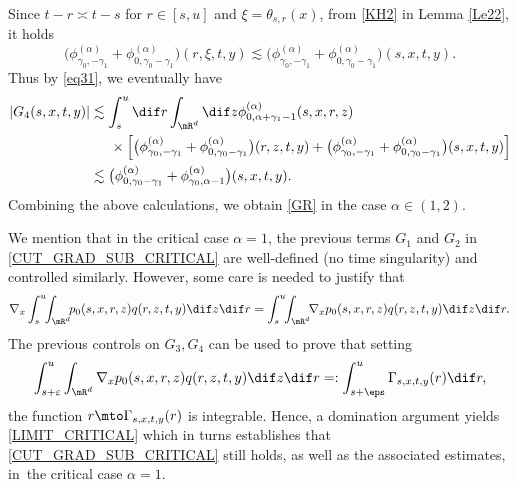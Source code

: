 Since $t-r \asymp t-s$ for $r\in[s,u]$ and $\xi=\theta_{s,r}(x)$, from \eqref{KH2} in Lemma \ref{Le22}, it holds
\[
\bigl(\phi^{(\alpha)}_{\gamma_0,-\gamma_1}+\phi^{(\alpha)}_{0,\gamma_0-\gamma_1}\bigr)(r,\xi,t,y)\lesssim \bigl(\phi^{(\alpha)}_{\gamma_0,-\gamma_1}+\phi^{(\alpha)}_{0,\gamma_0-\gamma_1}\bigr)(s,x,t,y).
\]
Thus by \eqref{eq31}, we eventually have
\begin{align*}
|G_4(s,x,t,y)|
&\lesssim \int_s^u\dif r \int_{\mR^d} \dif z \phi_{0,\alpha+\gamma_1-1}^{(\alpha)}(s,x,r,z)\\
&\hspace*{.5cm}\times\Big[ \bigl(\phi^{(\alpha)}_{\gamma_0,-\gamma_1}+\phi^{(\alpha)}_{0,\gamma_0-\gamma_1}\bigr)(r,z,t,y)+ \bigl(\phi^{(\alpha)}_{\gamma_0,-\gamma_1}+\phi^{(\alpha)}_{0,\gamma_0-\gamma_1}\bigr)(s,x,t,y) \Big]\\
&\lesssim \bigl(\phi^{(\alpha)}_{0,\gamma_0-\gamma_1}+\phi^{(\alpha)}_{\gamma_0,\alpha-1}\bigr)(s,x,t,y).
\end{align*}
Combining the above calculations, we obtain \eqref{GR} in the case $\alpha\in (1,2) $.

{We mention that in the critical case $\alpha=1 $, the previous terms $G_1$ and $G_2$ in \eqref{CUT_GRAD_SUB_CRITICAL} are well-defined (no time singularity) and controlled similarly. However, some care is needed to justify that
\begin{equation}\label{LIMIT_CRITICAL}
\nabla_x \int_s^u\!\!\int_{\mR^d}\!\! {p}_0(s,x,r,z)q(r,z,t,y)\dif z \dif r =\int_s^u\!\!\int_{\mR^d}\!\!\nabla_x {p}_0(s,x,r,z)q(r,z,t,y)\dif z \dif r.
\end{equation}
The previous controls on $G_3,G_4$ can be used to prove that setting
\[
\int_{s+\varepsilon}^u\int_{\mR^d}\nabla_x {p}_0(s,x,r,z)q(r,z,t,y)\dif z \dif r=:\int_{s+\eps}^u
\Gamma_{s,x,t,y}(r)\dif r,
\] the function $r\mto \Gamma_{s,x,t,y}(r) $ is integrable.
Hence, a domination argument yields \eqref{LIMIT_CRITICAL} which in turns establishes that \eqref{CUT_GRAD_SUB_CRITICAL} still holds, as well as the associated estimates, in~the critical case $\alpha=1 $}.

